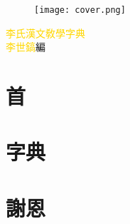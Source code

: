 \documentclass[a5paper,11pt]{report}
\begin{document}
\begin{titlepage}
\doublespacing
\begin{wrapfigure}{r}{50mm}
\texttt{[image: cover.png]}
\end{wrapfigure}
\hfill
\vfill
{\huge\textcolor{gold}{李氏漢文敎學字典}}\\
{\textcolor{gold}{李世鎬}\hspace{14pt}編}
\vspace{64pt}
\end{titlepage}
\addtolength{\topmargin}{20mm}
\newpage
\chapter*{首}
\doublespacing


\chapter*{字典}
\begin{multicols}{3}
\begin{flushleft}
\onehalfspacing

\end{flushleft}
\end{multicols}

\chapter*{謝恩}
\doublespacing

\end{document}
